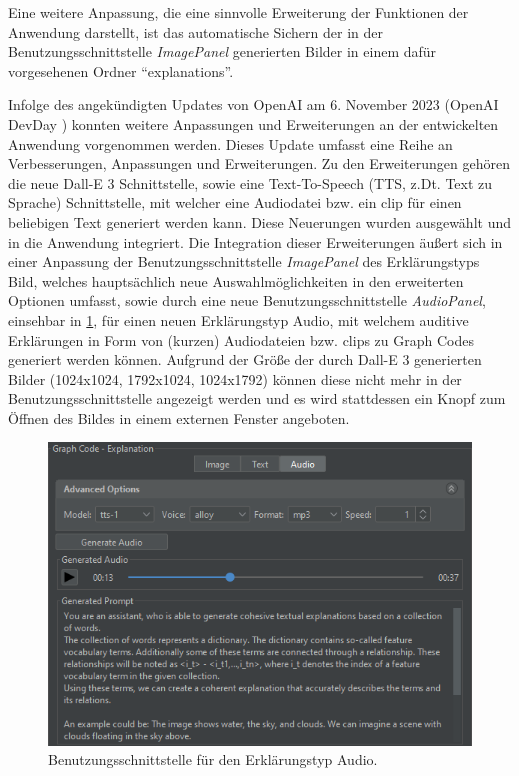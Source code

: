 Eine weitere Anpassung, die eine sinnvolle Erweiterung der Funktionen der Anwendung darstellt, ist das automatische Sichern der in der Benutzungsschnittstelle \textit{ImagePanel} generierten Bilder in einem dafür vorgesehenen Ordner \enquote{explanations}.


Infolge des angekündigten Updates \cite{openai-new-update-6_11_23} von OpenAI am 6. November 2023 (OpenAI DevDay \cite{openai-dev-day}) konnten weitere Anpassungen und Erweiterungen an der entwickelten Anwendung vorgenommen werden.
Dieses Update umfasst eine Reihe an Verbesserungen, Anpassungen und Erweiterungen.
Zu den Erweiterungen gehören die neue Dall-E 3 Schnittstelle, sowie eine Text-To-Speech (TTS, z.Dt. Text zu Sprache) Schnittstelle, mit welcher eine Audiodatei bzw. ein clip für einen beliebigen Text generiert werden kann.
Diese Neuerungen wurden ausgewählt und in die Anwendung integriert.
Die Integration dieser Erweiterungen äußert sich in einer Anpassung der Benutzungsschnittstelle \textit{ImagePanel} des Erklärungstyps Bild, welches hauptsächlich neue Auswahlmöglichkeiten in den erweiterten Optionen umfasst, sowie durch eine neue Benutzungsschnittstelle \textit{AudioPanel}, einsehbar in \cref{sec5:eval:subsubsec:adaptation:fig:audio-ui}, für einen neuen Erklärungstyp Audio, mit welchem auditive Erklärungen in Form von (kurzen) Audiodateien bzw. clips zu Graph Codes generiert werden können.
Aufgrund der Größe der durch Dall-E 3 generierten Bilder (1024x1024, 1792x1024, 1024x1792) können diese nicht mehr in der Benutzungsschnittstelle angezeigt werden und es wird stattdessen ein Knopf zum Öffnen des Bildes in einem externen Fenster angeboten.

\begin{figure}[!ht]
  \includegraphics{chapter/chapter_5/right_audio_exp}
  \caption{Benutzungsschnittstelle für den Erklärungstyp Audio.}
  \label{sec5:eval:subsubsec:adaptation:fig:audio-ui}
\end{figure}

